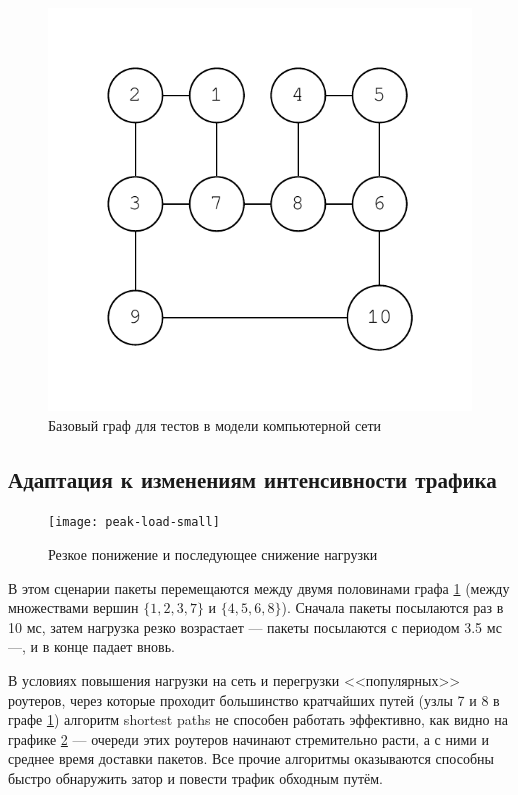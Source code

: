 \documentclass[specification,annotation,times]{itmo-student-thesis}
\theoremstyle{definition}
\begin{document}
\begin{figure}[!h]
  \caption{Базовый граф для тестов в модели компьютерной сети}\label{fig-simple-network}
  \centering
  \includegraphics[scale=0.6]{graph-2.pdf}
\end{figure}

\subsection{Адаптация к изменениям интенсивности трафика}

\begin{figure}[!h]
  \caption{Резкое понижение и последующее снижение нагрузки}\label{experiments:network:peak-load-small}
  \centering
  \texttt{[image: peak-load-small]}
\end{figure}

В этом сценарии пакеты перемещаются между двумя половинами
графа \ref{fig-simple-network} (между множествами вершин $\{1, 2, 3, 7\}$ и
$\{4, 5, 6, 8\}$). Сначала пакеты посылаются раз в 10 мс, затем нагрузка резко
возрастает --- пакеты посылаются с периодом 3.5 мс ---, и в конце падает вновь.

В условиях повышения нагрузки на сеть и перегрузки <<популярных>> роутеров,
через которые проходит большинство кратчайших путей (узлы 7 и 8 в графе
\ref{fig-simple-network}) алгоритм shortest paths не способен работать эффективно,
как видно на графике \ref{experiments:network:peak-load-small} --- очереди этих
роутеров начинают стремительно расти, а с ними и среднее время доставки пакетов.
Все прочие алгоритмы оказываются способны быстро обнаружить затор и повести
трафик обходным путём.
\end{document}
